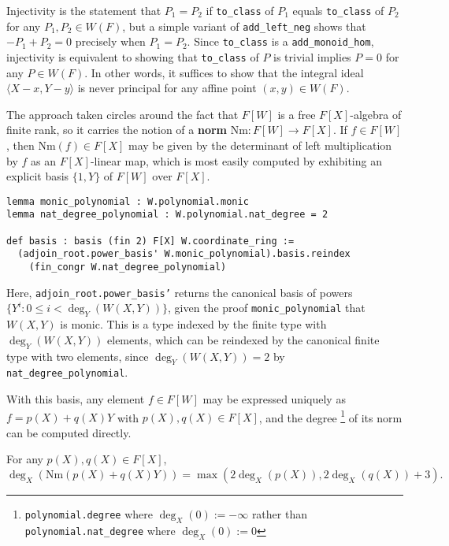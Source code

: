 \documentclass[a4paper,UKenglish,cleveref,autoref,thm-restate]{lipics-v2021}
\begin{document}
Injectivity is the statement that $ P_1 = P_2 $ if \texttt{to\_class} of $ P_1 $ equals \texttt{to\_class} of $ P_2 $ for any $ P_1, P_2 \in W(F) $, but a simple variant of \texttt{add\_left\_neg} shows that $ -P_1 + P_2 = 0 $ precisely when $ P_1 = P_2 $. Since \texttt{to\_class} is a \texttt{add\_monoid\_hom}, injectivity is equivalent to showing that \texttt{to\_class} of $ P $ is trivial implies $ P = 0 $ for any $ P \in W(F) $. In other words, it suffices to show that the integral ideal $ \langle X - x, Y - y \rangle $ is never principal for any affine point $ (x, y) \in W(F) $.

The approach taken circles around the fact that $ F[W] $ is a free $ F[X] $-algebra of finite rank, so it carries the notion of a \textbf{norm} $ \mathrm{Nm} : F[W] \to F[X] $. If $ f \in F[W] $, then $ \mathrm{Nm}(f) \in F[X] $ may be given by the determinant of left multiplication by $ f $ as an $ F[X] $-linear map, which is most easily computed by exhibiting an explicit basis $ \{1, Y\} $ of $ F[W] $ over $ F[X] $.
\begin{lstlisting}
lemma monic_polynomial : W.polynomial.monic
lemma nat_degree_polynomial : W.polynomial.nat_degree = 2

def basis : basis (fin 2) F[X] W.coordinate_ring :=
  (adjoin_root.power_basis' W.monic_polynomial).basis.reindex
    (fin_congr W.nat_degree_polynomial)
\end{lstlisting}
Here, \texttt{adjoin\_root.power\_basis'} returns the canonical basis of powers $ \{Y^i : 0 \le i < \deg_Y(W(X, Y))\} $, given the proof \texttt{monic\_polynomial} that $ W(X, Y) $ is monic. This is a type indexed by the finite type with $ \deg_Y(W(X, Y)) $ elements, which can be reindexed by the canonical finite type with two elements, since $ \deg_Y(W(X, Y)) = 2 $ by \texttt{nat\_degree\_polynomial}.

With this basis, any element $ f \in F[W] $ may be expressed uniquely as $ f = p(X) + q(X)Y $ with $ p(X), q(X) \in F[X] $, and the degree \footnote{\texttt{polynomial.degree} where $ \deg_X(0) := -\infty $ rather than \texttt{polynomial.nat\_degree} where $ \deg_X(0) := 0 $} of its norm can be computed directly.

\begin{lemma}
\label{lem:norm_smul_basis}
For any $ p(X), q(X) \in F[X] $,
\[ \deg_X(\mathrm{Nm}(p(X) + q(X)Y)) = \max(2\deg_X(p(X)), 2\deg_X(q(X)) + 3). \]
\end{lemma}
\end{document}
